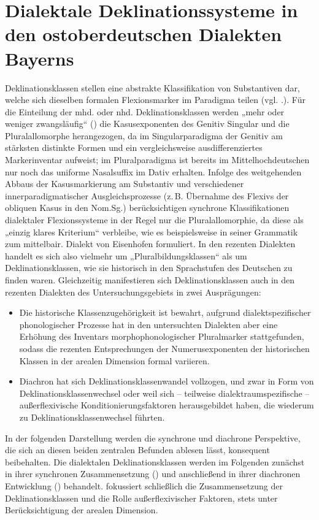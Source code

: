 \chapter{Dialektale Deklinationssysteme in den ostoberdeutschen Dialekten Bayerns}
\label{chap:8}
Deklinationsklassen stellen eine abstrakte Klassifikation von Substantiven dar, welche sich dieselben formalen Flexionsmarker im Paradigma teilen (vgl. .). Für die Einteilung der mhd. oder nhd. Deklinationsklassen werden „mehr oder weniger zwangsläufig“ (\citealt[71]{KleinEtAl2018}) die Kasusexponenten des Genitiv Singular und die Pluralallomorphe herangezogen, da im Singularparadigma der Genitiv am stärksten distinkte Formen und ein vergleichsweise ausdifferenziertes Markerinventar aufweist; im Pluralparadigma ist bereits im Mittelhochdeutschen nur noch das uniforme Nasalsuffix im Dativ erhalten. Infolge des weitgehenden Abbaus der Kasusmarkierung am Substantiv und verschiedener innerparadigmatischer Ausgleichsprozesse (z.\,B. Übernahme des Flexivs der obliquen Kasus in den Nom.Sg.) berücksichtigen synchrone Klassifikationen dialektaler Flexionssysteme in der Regel nur die Pluralallomorphie, da diese als „einzig klares Kriterium“ verbleibe, wie es beispielsweise \citet[41]{White1966} in seiner Grammatik zum mittelbair. Dialekt von Eisenhofen formuliert. In den rezenten Dialekten handelt es sich also vielmehr um „Pluralbildungsklassen“ \citep[170]{Rowley1997} als um Deklinationsklassen, wie sie historisch in den Sprachstufen des Deutschen zu finden waren. Gleichzeitig manifestieren sich Deklinationsklassen auch in den rezenten Dialekten des Untersuchungsgebiets in zwei Ausprägungen:

\begin{itemize}
\item Die historische Klassenzugehörigkeit ist bewahrt, aufgrund dialektspezifischer phonologischer Prozesse hat in den untersuchten Dialekten aber eine Erhöhung des Inventars morphophonologischer Pluralmarker stattgefunden, sodass die rezenten Entsprechungen der Numerusexponenten der historischen Klassen in der arealen Dimension formal variieren.
\item Diachron hat sich Deklinationsklassenwandel vollzogen, und zwar in Form von Deklinationsklassenwechsel oder weil sich -- teilweise dialektraumspezifische -- außerflexivische Konditionierungsfaktoren herausgebildet haben, die wiederum zu Deklinationsklassenwechsel führten.
\end{itemize}

In der folgenden Darstellung werden die synchrone und diachrone Perspektive, die sich an diesen beiden zentralen Befunden ablesen lässt, konsequent beibehalten. Die dialektalen Deklinationsklassen werden im Folgenden zunächst in ihrer synchronen Zusammensetzung () und anschließend in ihrer diachronen Entwicklung () behandelt.  fokussiert schließlich die Zusammensetzung der Deklinationsklassen und die Rolle außerflexivischer Faktoren, stets unter Berücksichtigung der arealen Dimension.

